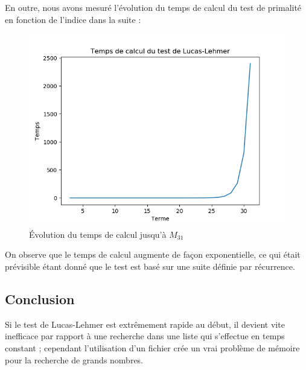 En outre, nous avons mesuré l'évolution du temps de calcul du test de primalité en fonction de l'indice dans la suite :
\begin{figure}[!h]
\begin{center}
\includegraphics[scale=0.5]{images/evo_lucas.png}
\end{center}
\caption{Évolution du temps de calcul jusqu'à $M_{31}$}
\end{figure}

On observe que le temps de calcul augmente de façon exponentielle, ce qui était prévisible étant donné que le test est basé sur une suite définie par récurrence.\\

\subsection{Conclusion}
Si le test de Lucas-Lehmer est extrêmement rapide au début, il devient vite inefficace par rapport à une recherche dans une liste qui s'effectue en temps constant ; cependant l'utilisation d'un fichier crée un vrai problème de mémoire pour la recherche de grands nombres.
